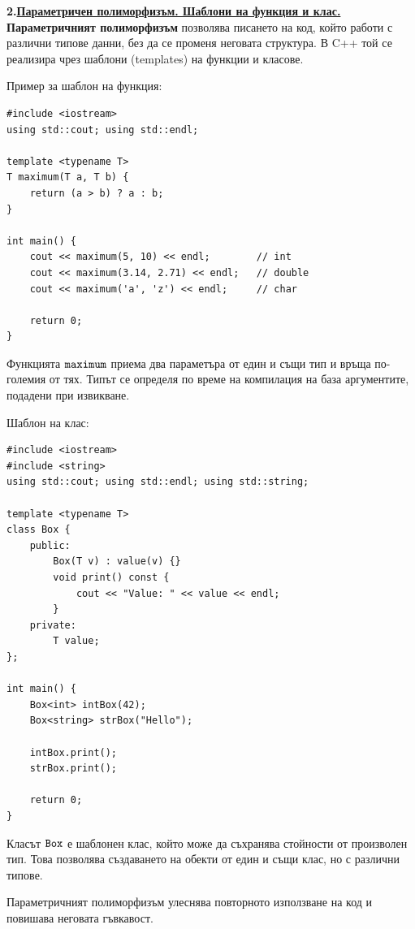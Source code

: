 \documentclass{article}
\begin{document}
\textbf{2.\underline{Параметричен полиморфизъм. Шаблони на функция и клас.}} \newline\newline
\textbf{Параметричният полиморфизъм} позволява писането на код, който работи с различни типове данни, без да се променя неговата структура.
В C++ той се реализира чрез шаблони (templates) на функции и класове.

Пример за шаблон на функция:
\begin{lstlisting}[style=cpp]
#include <iostream>
using std::cout; using std::endl;

template <typename T>
T maximum(T a, T b) {
    return (a > b) ? a : b;
}

int main() {
    cout << maximum(5, 10) << endl;        // int
    cout << maximum(3.14, 2.71) << endl;   // double
    cout << maximum('a', 'z') << endl;     // char

    return 0;
}
\end{lstlisting}
Функцията $\textcolor{black}{\texttt{maximum}}$ приема два параметъра от един и същи тип и връща по-големия от тях. Типът се определя по време на компилация
на база аргументите, подадени при извикване.

Шаблон на клас:
\begin{lstlisting}[style=cpp]
#include <iostream>
#include <string>
using std::cout; using std::endl; using std::string;

template <typename T>
class Box {
    public:
        Box(T v) : value(v) {}
        void print() const {
            cout << "Value: " << value << endl;
        }
    private:
        T value;
};

int main() {
    Box<int> intBox(42);
    Box<string> strBox("Hello");

    intBox.print();
    strBox.print();

    return 0;
}
\end{lstlisting}

Класът $\textcolor{black}{\texttt{Box}}$ е шаблонен клас, който може да съхранява стойности от произволен тип. Това позволява създаването на обекти от
един и същи клас, но с различни типове.

Параметричният полиморфизъм улеснява повторното използване на код и повишава неговата гъвкавост.
\end{document}
